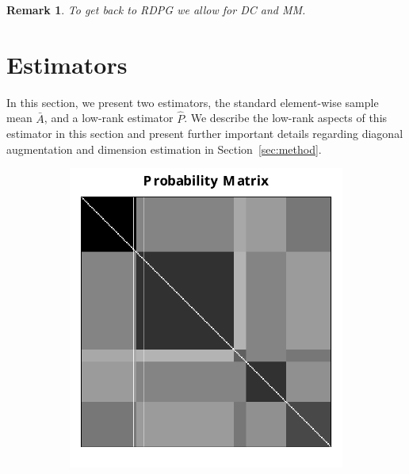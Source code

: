 \documentclass[10pt,letterpaper]{article}
\newtheorem{remark}[fact]{Remark}
\renewcommand{\hat}{\widehat}
\begin{document}
\begin{remark}
To get back to RDPG we allow for DC and MM.
\end{remark}


\section{Estimators}
\label{sec:estimator}

In this section, we present two estimators, the standard element-wise sample mean $\bar{A}$, and a low-rank estimator $\hat{P}$.
We describe the low-rank aspects of this estimator in this section and present further important details regarding diagonal augmentation and dimension estimation in Section~\ref{sec:method}.

\begin{figure}
\centering
\begin{subfigure}{.4\textwidth}
  \centering
  \includegraphics[width=\linewidth]{SBM_P.pdf}
\end{subfigure}%
\begin{subfigure}{.4\textwidth}
  \centering

\end{subfigure}
\end{figure}
\end{document}
